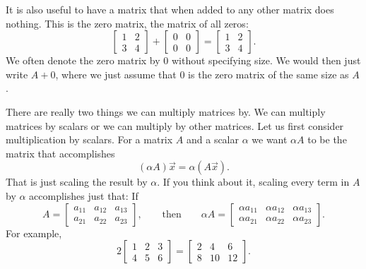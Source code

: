 It is also useful to have a matrix that when added to any other matrix
does nothing.  This is the zero matrix, the matrix of all zeros:
\begin{equation*}
\begin{bmatrix}
1 & 2 \\
3 & 4
\end{bmatrix}
+
\begin{bmatrix}
0 & 0 \\
0 & 0
\end{bmatrix}
=
\begin{bmatrix}
1 & 2 \\
3 & 4
\end{bmatrix} .
\end{equation*}
We often denote the zero matrix
by $0$ without specifying size.  We would then just write $A + 0$, where we
just assume that $0$ is the zero matrix of the same size as $A$.

\medskip

There are really two things we can multiply matrices by.  We can multiply
matrices by scalars or we can multiply by other matrices.  Let us first
consider multiplication by scalars.
For a matrix $A$ and a scalar $\alpha$ we want $\alpha A$ to be the matrix
that accomplishes
\begin{equation*}
(\alpha A) \vec{x} = \alpha (A \vec{x}) .
\end{equation*}
That is just scaling the result by $\alpha$.  If you think about it,
scaling every term in $A$ by $\alpha$ accomplishes just that:
If
\begin{equation*}
A = 
\begin{bmatrix}
a_{11} & a_{12} & a_{13}  \\
a_{21} & a_{22} & a_{23}
\end{bmatrix},
\qquad\text{then} \qquad
\alpha A = 
\begin{bmatrix}
\alpha a_{11} & \alpha a_{12} & \alpha a_{13}  \\
\alpha a_{21} & \alpha a_{22} & \alpha a_{23}
\end{bmatrix} .
\end{equation*}
For example,
\begin{equation*}
2
\begin{bmatrix}
1 & 2 & 3 \\
4 & 5 & 6
\end{bmatrix} =
\begin{bmatrix}
2 & 4 & 6 \\
8 & 10 & 12
\end{bmatrix} .
\end{equation*}

